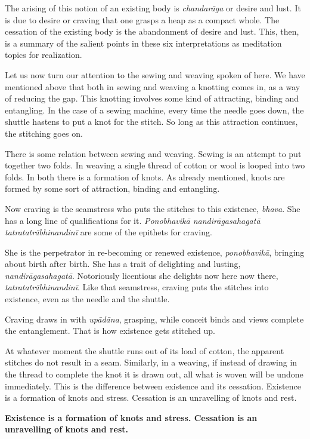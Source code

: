 The arising of this notion of an existing body is \emph{chandarāga} or desire and lust. It is due to desire or craving that one grasps a heap as a compact whole. The cessation of the existing body is the abandonment of desire and lust. This, then, is a summary of the salient points in these six interpretations as meditation topics for realization.

Let us now turn our attention to the sewing and weaving spoken of here. We have mentioned above that both in sewing and weaving a knotting comes in, as a way of reducing the gap. This knotting involves some kind of attracting, binding and entangling. In the case of a sewing machine, every time the needle goes down, the shuttle hastens to put a knot for the stitch. So long as this attraction continues, the stitching goes on.

There is some relation between sewing and weaving. Sewing is an attempt to put together two folds. In weaving a single thread of cotton or wool is looped into two folds. In both there is a formation of knots. As already mentioned, knots are formed by some sort of attraction, binding and entangling.

Now craving is the seamstress who puts the stitches to this existence, \emph{bhava}. She has a long line of qualifications for it. \emph{Ponobhavikā nandirāgasahagatā tatratatrābhinandinī} are some of the epithets for craving.

She is the perpetrator in re-becoming or renewed existence, \emph{ponobhavikā}, bringing about birth after birth. She has a trait of delighting and lusting, \emph{nandirāgasahagatā}. Notoriously licentious she delights now here now there, \emph{tatratatrābhinandinī}. Like that seamstress, craving puts the stitches into existence, even as the needle and the shuttle.

Craving draws in with \emph{upādāna}, grasping, while conceit binds and views complete the entanglement. That is how existence gets stitched up.

At whatever moment the shuttle runs out of its load of cotton, the apparent stitches do not result in a seam. Similarly, in a weaving, if instead of drawing in the thread to complete the knot it is drawn out, all what is woven will be undone immediately. This is the difference between existence and its cessation. Existence is a formation of knots and stress. Cessation is an unravelling of knots and rest.

\textbf{Existence is a formation of knots and stress. Cessation is an unravelling of knots and rest.}

